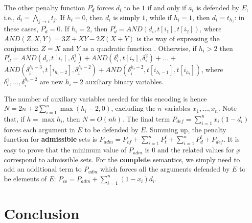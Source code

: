 \documentclass[conference]{IEEEtran}
\newcommand{\atts}{\ensuremath{\rightarrow}\xspace}
\begin{document}
The other penalty function $P_{d}^i$ forces $d_i$ to be $1$ if and only if $a_i$ is defended by $E$, i.e.,
$ d_i = \bigwedge_{j \atts i} t_j $.
If $h_i=0$, then $d_i$ is simply $1$, while if $h_i=1$, then $d_i=t_{h_1}$:
in these cases, $P_{d}^i=0$.
If $h_i=2$, then $P_{d}^i=AND(d_i,t[i_1],t[i_2])$, where
$ AND(Z,X,Y)=3Z+XY-2Z(X+Y) $
is the way of expressing the conjunction $Z=X\mbox{ and }Y$ as a quadratic function 
\cite{rosenberg}. Otherwise, if $h_i>2$ then
$ P_d^i=AND(d_i,t[i_1],\delta_i^1)+AND(\delta_i^1,t[i_2],\delta_i^2)+\dots$
+$ AND(\delta_i^{h_i-3},t[i_{h_i-2}],\delta_i^{h_i-2})+AND(\delta_i^{h_i-2},t[i_{h_i-1}], t[i_{h_i}])$, where $\delta_i^1,\dots,\delta_i^{h_i-2}$ are new $h_i-2$ auxiliary binary variables.

The number of auxiliary variables needed for this encoding is hence $N=2n+2\sum_{i=1}^n \max(h_i-2,0)$, excluding the $n$ variables $x_1,\dots,x_n$. 
Note that, if $h=\max h_i$, then $N=O(nh)$.
The final term $ P_{def}= \sum_{i=1}^n x_i(1-d_i) $
forces each argument in $E$ to be defended by $E$.
Summing up, the penalty function for \textbf{admissible} sets is
$ P_{adm}=P_{cf}+ \sum_{i=1}^n P_t^i + \sum_{i=1}^n P_d^i 
+ P_{def}$.
It is easy to prove that the minimum value of $P_{adm}$ is $0$ and the related values for $\underbar{x}$ correspond to admissible sets. For the \textbf{complete} semantics, we simply need to add an additional term to $P_{adm}$
which forces all the arguments defended by $E$ to be elements of $E$:
$ P_{co}=P_{adm} + \sum_{i=1}^n (1-x_i)d_i$.

\fi

\section{Conclusion}\label{sec:conclusion}




\end{document}
